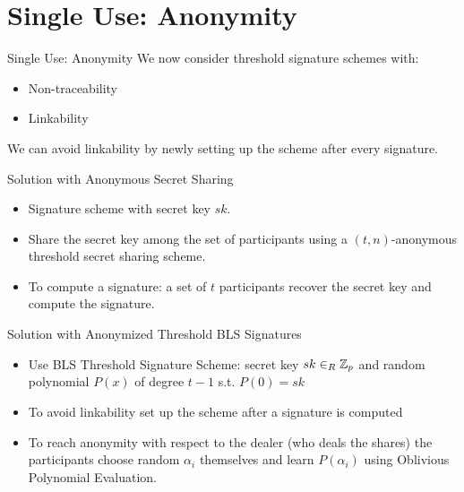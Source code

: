 \section{Single Use: Anonymity}
\begin{frame}{Single Use: Anonymity}
We now consider threshold signature schemes with:
\begin{itemize}
\item Non-traceability
\item Linkability
\end{itemize}

We can avoid linkability by newly setting up the scheme after every signature.

\end{frame}

\begin{frame}{Solution with Anonymous Secret Sharing}
\begin{itemize}
\item Signature scheme with secret key $sk$.
\item Share the secret key among the set of participants using a $(t,n)$-anonymous threshold secret sharing scheme.
\item To compute a signature: a set of $t$ participants recover the secret key and compute the signature.
\end{itemize}
\end{frame}

\begin{frame}{Solution with Anonymized Threshold BLS Signatures}
\begin{itemize}
\item Use BLS Threshold Signature Scheme: secret key $sk \in_R {\mathbb Z}_p$ and random polynomial $P(x)$ of degree $t-1$ s.t. $P(0) = sk$
\item To avoid linkability set up the scheme after a signature is computed
\item To reach anonymity with respect to the dealer (who deals the shares) the participants choose random $\alpha_i$ themselves and learn $P(\alpha_i)$ using Oblivious Polynomial Evaluation.
\end{itemize}

\end{frame}